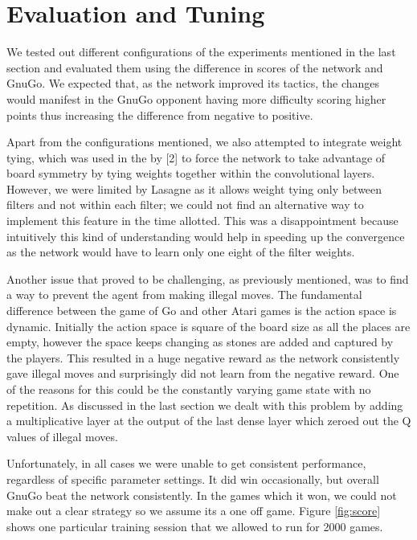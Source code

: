 \section{Evaluation and Tuning}

We tested out different configurations of the experiments mentioned in the last section and evaluated them using the difference in scores of the network and GnuGo. We expected that, as the network improved its tactics, the changes would manifest in the GnuGo opponent having more difficulty scoring higher points thus increasing the difference from negative to positive.

Apart from the configurations mentioned, we also attempted to integrate weight tying, which was used in the by [2] to force the network to take advantage of board symmetry by tying weights together within the convolutional layers. However, we were limited by Lasagne as it allows weight tying only between filters and not within each filter; we could not find an alternative way to implement this feature in the time allotted. This was a disappointment because intuitively this kind of understanding would help in speeding up the convergence as the network would have to learn only one eight of the filter weights. 

Another issue that proved to be challenging, as previously mentioned, was to find a way to prevent the agent from making illegal moves. The fundamental difference between the game of Go and other Atari games is the action space is dynamic. Initially the action space is square of the board size as all the places are empty, however the space keeps changing as stones are added and captured by the players. This resulted in a huge negative reward as the network consistently gave illegal moves and surprisingly did not learn from the negative reward. One of the reasons for this could be the constantly varying game state with no repetition. As discussed in the last section we dealt with this problem by adding a multiplicative layer at the output of the last dense layer which zeroed out the Q values of illegal moves.  

Unfortunately, in all cases we were unable to get consistent performance, regardless of specific parameter settings. It did win occasionally, but overall GnuGo beat the network consistently. In the games which it won, we could not make out a clear strategy so we assume its a one off game. Figure \ref{fig:score} shows one particular training session that we allowed to run for 2000 games. 


